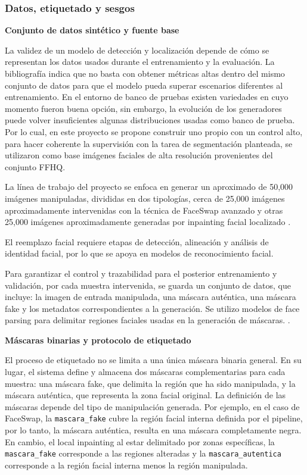 \subsubsection{Datos, etiquetado y sesgos}

\medskip\textbf{Conjunto de datos sintético y fuente base}

La validez de un modelo de detección y localización depende de cómo se representan los datos usados durante el entrenamiento y la evaluación. La bibliografía indica que no basta con obtener métricas altas dentro del mismo conjunto de datos para que el modelo pueda superar escenarios diferentes al entrenamiento. En el entorno de banco de pruebas existen variedades en cuyo momento fueron buena opción, sin embargo, la evolución de los generadores puede volver insuficientes algunas distribuciones usadas como banco de prueba. Por lo cual, en este proyecto se propone construir uno propio con un control alto, para hacer coherente la supervisión con la tarea de segmentación planteada, se utilizaron como base imágenes faciales de alta resolución provenientes del conjunto FFHQ\parencite{Rossler_2019_ICCV, Karras2019}.

La línea de trabajo del proyecto se enfoca en generar un aproximado de 50,000 imágenes manipuladas, divididas en dos tipologías, cerca de 25,000 imágenes aproximadamente intervenidas con la técnica de FaceSwap avanzado y otras 25,000 imágenes aproximadamente generadas por inpainting facial localizado \parencite{Rombach2022}.

El reemplazo facial requiere etapas de detección, alineación y análisis de identidad facial, por lo que se apoya en modelos de reconocimiento facial.\parencite{Deng2019ArcFace}

Para garantizar el control y trazabilidad para el posterior entrenamiento y validación, por cada muestra intervenida, se guarda un conjunto de datos, que incluye: la imagen de entrada manipulada, una máscara auténtica, una máscara fake y los metadatos correspondientes a la generación. Se utilizo  modelos de face parsing para delimitar regiones faciales usadas en la generación de máscaras. \parencite{Yu2019bisenet}.

\medskip\textbf{Máscaras binarias y protocolo de etiquetado}

El proceso de etiquetado no se limita a una única máscara binaria general. En su lugar, el sistema define y almacena dos máscaras complementarias para cada muestra: una máscara fake, que delimita la región que ha sido manipulada, y la máscara auténtica, que representa la zona facial original. La definición de las máscaras depende del tipo de manipulación generada. Por ejemplo, en el caso de FaceSwap, la \texttt{mascara\_fake} cubre la región facial interna definida por el pipeline, por lo tanto, la máscara auténtica, resulta en una máscara completamente negra. En cambio, el local inpainting al estar delimitado por zonas específicas, la \texttt{mascara\_fake} corresponde a las regiones alteradas y la \texttt{mascara\_autentica} corresponde a la región facial interna menos la región manipulada.

